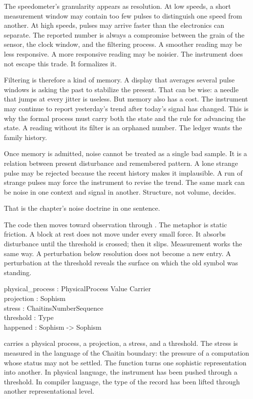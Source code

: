The speedometer's granularity appears as resolution. At low speeds, a short
measurement window may contain too few pulses to distinguish one speed from
another. At high speeds, pulses may arrive faster than the electronics can
separate. The reported number is always a compromise between the grain of the
sensor, the clock window, and the filtering process. A smoother reading may be
less responsive. A more responsive reading may be noisier. The instrument does
not escape this trade. It formalizes it.

Filtering is therefore a kind of memory. A display that averages several pulse
windows is asking the past to stabilize the present. That can be wise: a needle
that jumps at every jitter is useless. But memory also has a cost. The
instrument may continue to report yesterday's trend after today's signal has
changed. This is why the formal process must carry both the state and the rule
for advancing the state. A reading without its filter is an orphaned number.
The ledger wants the family history.

Once memory is admitted, noise cannot be treated as a single bad sample. It is
a relation between present disturbance and remembered pattern. A lone strange
pulse may be rejected because the recent history makes it implausible. A run of
strange pulses may force the instrument to revise the trend. The same mark can
be noise in one context and signal in another. Structure, not volume, decides.

That is the chapter's noise doctrine in one sentence.

The code then moves toward observation through . The metaphor
is static friction. A block at rest does not move under every small force. It
absorbs disturbance until the threshold is crossed; then it slips. Measurement
works the same way. A perturbation below resolution does not become a new
entry. A perturbation at the threshold reveals the surface on which the old
symbol was standing.

\begin{leancode}
physical\_process : PhysicalProcess Value Carrier\\
projection : Sophism\\
stress : ChaitinsNumberSequence\\
threshold : Type\\
happened : Sophism -> Sophism
\end{leancode}

 carries a physical process, a projection, a stress, and a
threshold. The stress is measured in the language of the Chaitin boundary: the
pressure of a computation whose status may not be settled. The function
 turns one sophistic representation into another. In physical
language, the instrument has been pushed through a threshold. In compiler
language, the type of the record has been lifted through another
representational level.

